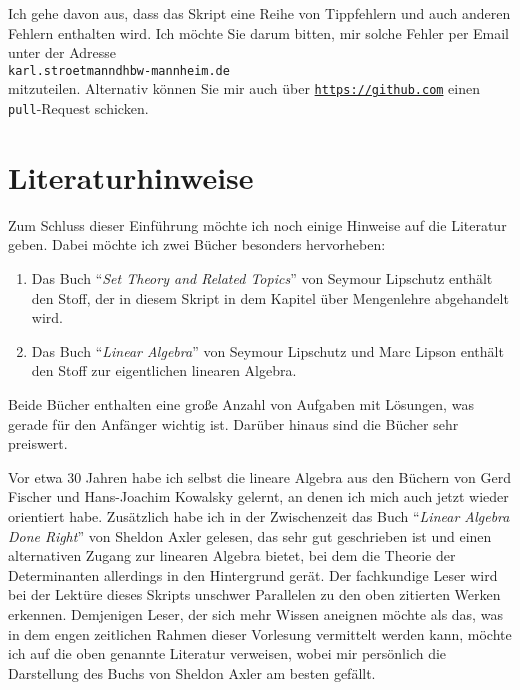 \remark
Ich gehe davon aus,  dass das  Skript eine Reihe von Tippfehlern und auch anderen Fehlern enthalten
wird.  Ich möchte Sie darum bitten, mir solche Fehler per Email unter der Adresse
\\[0.2cm]
\hspace*{1.3cm}
\texttt{karl.stroetmanndhbw-mannheim.de}
\\[0.2cm]
mitzuteilen.  Alternativ können Sie mir auch über
\href{https://github.com}{\texttt{https://github.com}} einen \texttt{pull}-Request schicken.

\section{Literaturhinweise}
Zum Schluss dieser Einführung möchte ich noch einige Hinweise auf die Literatur geben.  Dabei möchte
ich zwei Bücher besonders hervorheben:
\begin{enumerate}
\item Das Buch ``\emph{Set Theory and Related Topics}'' von Seymour Lipschutz \cite{lipschutz:1998} enthält den Stoff, der
      in diesem Skript in dem Kapitel über Mengenlehre abgehandelt wird.
\item Das Buch ``\emph{Linear Algebra}'' von Seymour Lipschutz und Marc Lipson \cite{lipschutz:2012}
      enthält den Stoff zur eigentlichen linearen Algebra.
\end{enumerate}
Beide Bücher enthalten eine große Anzahl von Aufgaben mit Lösungen, was gerade für den Anfänger
wichtig ist.  Darüber hinaus sind die Bücher
sehr preiswert.  

Vor etwa 30 Jahren habe ich selbst die lineare Algebra aus den Büchern von Gerd Fischer
\cite{fischer:2008} und Hans-Joachim Kowalsky \cite{kowalsky:2003} gelernt, an denen ich mich auch
jetzt wieder orientiert habe.  Zusätzlich habe ich in der Zwischenzeit das Buch 
``\emph{Linear Algebra Done Right}'' von Sheldon Axler \cite{axler:1997} gelesen, das sehr gut geschrieben ist
und einen alternativen Zugang zur linearen Algebra bietet, bei dem die Theorie der Determinanten
allerdings in den Hintergrund gerät.  Der fachkundige Leser wird bei der Lektüre dieses Skripts
unschwer Parallelen zu den oben zitierten Werken erkennen.   Demjenigen Leser, der sich mehr Wissen
aneignen möchte als das, was in dem engen zeitlichen Rahmen dieser Vorlesung vermittelt werden kann,
möchte ich auf die oben genannte Literatur verweisen, wobei mir persönlich die Darstellung des Buchs
von Sheldon Axler am besten gefällt. 


